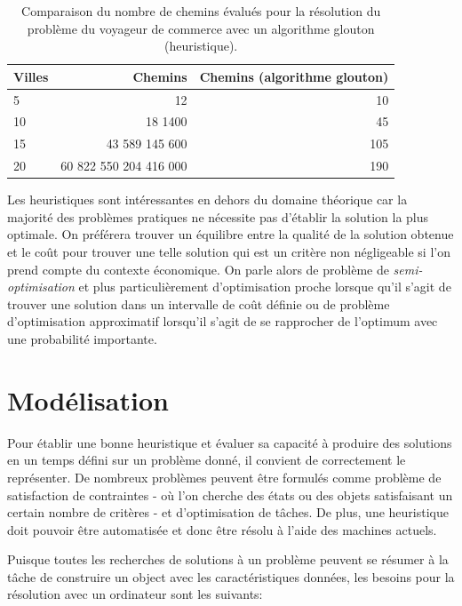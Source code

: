 \begin{table}[h]
\centering
\label{table-comparaison-chemins}
\begin{tabular}{ l|r|r }
  Villes & Chemins & Chemins (algorithme glouton) \\
  \hline
  5  & 12                     & 10  \\
  10 & 18 1400                & 45  \\
  15 & 43 589 145 600         & 105 \\
  20 & 60 822 550 204 416 000 & 190 \\
\end{tabular}
  \caption{Comparaison du nombre de chemins évalués pour la résolution du problème du voyageur de commerce avec un algorithme glouton (heuristique).}
\end{table}

Les heuristiques sont intéressantes en dehors du domaine théorique car la majorité des problèmes pratiques ne nécessite pas d'établir la solution la plus optimale. On préférera trouver un équilibre entre la qualité de la solution obtenue et le coût pour trouver une telle solution qui est un critère non négligeable si l'on prend compte du contexte économique. On parle alors de problème de \textit{semi-optimisation} et plus particulièrement d'optimisation proche lorsque qu'il s'agit de trouver une solution dans un intervalle de coût définie ou de problème d'optimisation approximatif lorsqu'il s'agit de se rapprocher de l'optimum avec une probabilité importante.


\section{Modélisation}
Pour établir une bonne heuristique et évaluer sa capacité à produire des solutions en un temps défini sur un problème donné, il convient de correctement le représenter.
De nombreux problèmes peuvent être formulés comme problème de satisfaction de contraintes - où l'on cherche des états ou des objets satisfaisant un certain nombre de critères - et d'optimisation de tâches. De plus, une heuristique doit pouvoir être automatisée et donc être résolu à l'aide des machines actuels.

Puisque toutes les recherches de solutions à un problème peuvent se résumer à la tâche de construire un object avec les caractéristiques données, les besoins\cite{judea-pearl-heuristics} pour la résolution avec un ordinateur sont les suivants:

